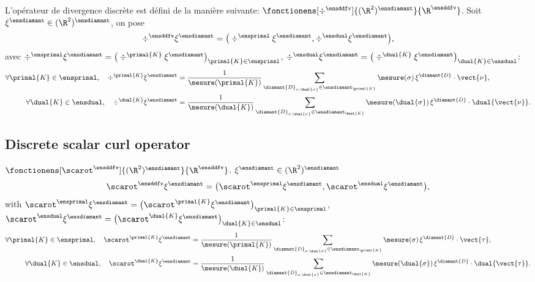 \begin{defi}
L'opérateur de divergence discrète est défini de la manière suivante: $\fonctionens[\div^\ensddfv]{(\R^2)^\ensdiamant}{\R^\ensddfv}$. Soit $\xi^\ensdiamant \in (\R^2)^\ensdiamant$, on pose
\[
\div^\ensddfv \xi^\ensdiamant = \mathopen{}\big( 
\div^\ensprimal \xi^\ensdiamant,
\div^\ensdual \xi^\ensdiamant    
\big),
\]
avec $\div^\ensprimal \xi^\ensdiamant = \mathopen{}\big(\div^{\primal{K}} \xi^\ensdiamant \big)_{\primal{K} \in \ensprimal}$, $\div^\ensdual \xi^\ensdiamant = \mathopen{}\big( \div^{\dual{K}} \xi^\ensdiamant \big)_{\dual{K} \in \ensdual}$:
\begin{align*}
    \forall \primal{K} \in \ensprimal, \quad \div^{\primal{K}} \xi^\ensdiamant &= \frac{1}{\mesure(\primal{K})} \sum_{\diamant{D}_{\sigma, \dual{\sigma}} \in \ensdiamant_{\primal{K}}} \mesure(\sigma) \, \xi^{\diamant{D}} \cdot \vect{\nu}, \\
    \forall \dual{K} \in \ensdual, \quad \div^{\dual{K}} \xi^\ensdiamant &= \frac{1}{\mesure(\dual{K})} \sum_{\diamant{D}_{\sigma, \dual{\sigma}} \in \ensdiamant_{\dual{K}}} \mesure(\dual{\sigma}) \, \xi^{\diamant{D}} \cdot \dual{\vect{\nu}}.
\end{align*}    
\end{defi}

\subsection{Discrete scalar curl operator}

\begin{defi}
$\fonctionens[\scarot^\ensddfv]{(\R^2)^\ensdiamant}{\R^\ensddfv}$. $\xi^\ensdiamant \in (\R^2)^\ensdiamant$
\[
\scarot^\ensddfv \xi^\ensdiamant = \mathopen{}\big( 
\scarot^\ensprimal \xi^\ensdiamant,
\scarot^\ensdual \xi^\ensdiamant    
\big),
\]
with $\scarot^\ensprimal \xi^\ensdiamant = \mathopen{}\big(\scarot^{\primal{K}} \xi^\ensdiamant \big)_{\primal{K} \in \ensprimal}$, $\scarot^\ensdual \xi^\ensdiamant = \mathopen{}\big( \scarot^{\dual{K}} \xi^\ensdiamant \big)_{\dual{K} \in \ensdual}$:
\begin{align*}
    \forall \primal{K} \in \ensprimal, \quad \scarot^{\primal{K}} \xi^\ensdiamant &= \frac{1}{\mesure(\primal{K})} \sum_{\diamant{D}_{\sigma, \dual{\sigma}} \in \ensdiamant_{\primal{K}}} \mesure(\sigma) \, \xi^{\diamant{D}} \cdot \vect{\tau}, \\
    \forall \dual{K} \in \ensdual, \quad \scarot^{\dual{K}} \xi^\ensdiamant &= \frac{1}{\mesure(\dual{K})} \sum_{\diamant{D}_{\sigma, \dual{\sigma}} \in \ensdiamant_{\dual{K}}} \mesure(\dual{\sigma}) \, \xi^{\diamant{D}} \cdot \dual{\vect{\tau}}.
\end{align*}   
\end{defi}


